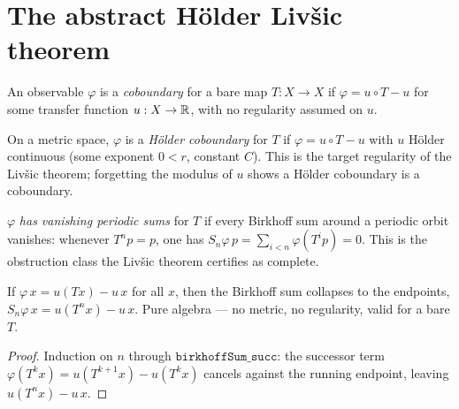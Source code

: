 \section{The abstract Hölder Livšic theorem}

\begin{definition}[Coboundary]\label{def:livsic-coboundary}
  \leanok
  An observable \(\varphi\) is a \emph{coboundary} for a bare map \(T:X\to X\) if
  \(\varphi = u\circ T - u\) for some transfer function \(u:X\to\mathbb{R}\), with no regularity assumed on
  \(u\).
\end{definition}

\begin{definition}\label{def:livsic-holdercoboundary}
  \leanok
  On a metric space, \(\varphi\) is a \emph{Hölder coboundary} for \(T\) if
  \(\varphi = u\circ T - u\) with \(u\) Hölder continuous (some exponent \(0 < r\), constant \(C\)).
  This is the target regularity of the Livšic theorem; forgetting the modulus of \(u\) shows a
  Hölder coboundary is a coboundary.
\end{definition}

\begin{definition}\label{def:livsic-vps}
  \leanok
  \(\varphi\) \emph{has vanishing periodic sums} for \(T\) if every Birkhoff sum around a periodic
  orbit vanishes: whenever \(T^n p = p\), one has \(S_n\varphi\,p = \sum_{i<n}\varphi(T^i p) = 0\).
  This is the obstruction class the Livšic theorem certifies as complete.
\end{definition}

\begin{lemma}\label{lem:livsic-telescope}
  \leanok
  If \(\varphi\,x = u(T x) - u\,x\) for all \(x\), then the Birkhoff sum collapses to the endpoints,
  \(S_n\varphi\,x = u(T^n x) - u\,x\). Pure algebra --- no metric, no regularity, valid for a bare
  \(T\).
\end{lemma}
\begin{proof}\leanok
  Induction on \(n\) through \(\texttt{birkhoffSum\_succ}\): the successor term \(\varphi(T^k x) =
  u(T^{k+1}x) - u(T^k x)\) cancels against the running endpoint, leaving \(u(T^n x) - u\,x\).
\end{proof}

